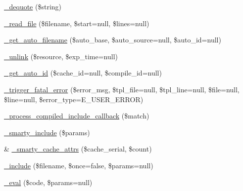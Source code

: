 \begin{DoxyCompactItemize}
\item 
\hyperlink{class_smarty_a48d43e818f2469134f3202f1a4256917}{\-\_\-dequote} (\$string)
\item 
\hyperlink{class_smarty_a8c4016aac6db09073b41520c2e5faec5}{\-\_\-read\-\_\-file} (\$filename, \$start=null, \$lines=null)
\item 
\hyperlink{class_smarty_a3e145fee368d93f35313bcb7018c1a76}{\-\_\-get\-\_\-auto\-\_\-filename} (\$auto\-\_\-base, \$auto\-\_\-source=null, \$auto\-\_\-id=null)
\item 
\hyperlink{class_smarty_ab5aba685ce31a74ce598d75f623361dd}{\-\_\-unlink} (\$resource, \$exp\-\_\-time=null)
\item 
\hyperlink{class_smarty_ae59d86c80bb3e74dbe8831f7a0a0687c}{\-\_\-get\-\_\-auto\-\_\-id} (\$cache\-\_\-id=null, \$compile\-\_\-id=null)
\item 
\hyperlink{class_smarty_a069f86732ff92f739c488416e0958307}{\-\_\-trigger\-\_\-fatal\-\_\-error} (\$error\-\_\-msg, \$tpl\-\_\-file=null, \$tpl\-\_\-line=null, \$file=null, \$line=null, \$error\-\_\-type=\-E\-\_\-\-U\-S\-E\-R\-\_\-\-E\-R\-R\-O\-R)
\item 
\hyperlink{class_smarty_a7ee77f3dd4e8b79f3f070b20e890af00}{\-\_\-process\-\_\-compiled\-\_\-include\-\_\-callback} (\$match)
\item 
\hyperlink{class_smarty_a2636e88dc9c8c3876aa63720c7d6ac25}{\-\_\-smarty\-\_\-include} (\$params)
\item 
\& \hyperlink{class_smarty_accf8fe1e81964b9abae199964a229c5b}{\-\_\-smarty\-\_\-cache\-\_\-attrs} (\$cache\-\_\-serial, \$count)
\item 
\hyperlink{class_smarty_a9e571fe5ba948fca1a9b31ac69e24546}{\-\_\-include} (\$filename, \$once=false, \$params=null)
\item 
\hyperlink{class_smarty_a9b47d457e9e3d4d47a696d77dfa43e7f}{\-\_\-eval} (\$code, \$params=null)
\end{DoxyCompactItemize}

